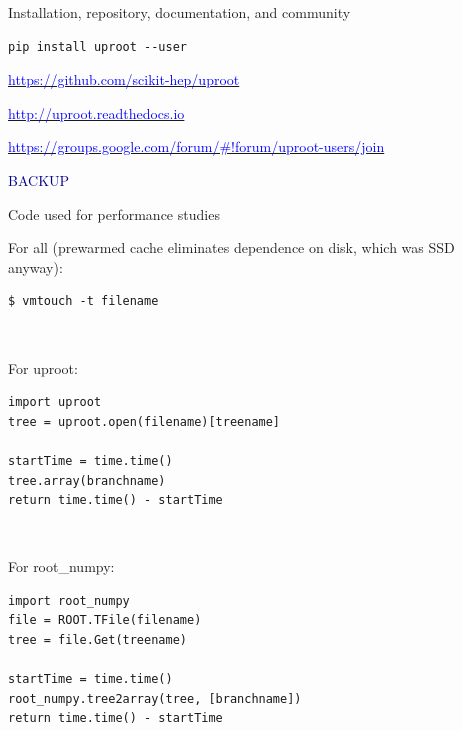 \documentclass[aspectratio=169]{beamer}
\begin{document}
\begin{frame}[fragile]{Installation, repository, documentation, and community}
\vspace{0.5 cm}
\huge
\begin{center}
\begin{minipage}{0.8\linewidth}
\begin{verbatim}
pip install uproot --user
\end{verbatim}
\end{minipage}

\Large
\vspace{1 cm}
\href{https://github.com/scikit-hep/uproot}{\textcolor{blue}{https://github.com/scikit-hep/uproot}}

\vspace{0.5 cm}
\href{http://uproot.readthedocs.io}{\textcolor{blue}{http://uproot.readthedocs.io}}

\vspace{0.5 cm}
\href{https://groups.google.com/forum/#!forum/uproot-users/join}{\textcolor{blue}{https://groups.google.com/forum/\#!forum/uproot-users/join}}
\end{center}
\end{frame}

\begin{frame}{}
\begin{center}
\Huge \textcolor{darkblue}{BACKUP}
\end{center}
\end{frame}

\begin{frame}[fragile]{Code used for performance studies}
\vspace{0.5 cm}
\scriptsize

{\normalsize For all (prewarmed cache eliminates dependence on disk, which was SSD anyway):}

\begin{verbatim}
$ vmtouch -t filename
\end{verbatim}

\vspace{0.5 cm}
\mbox{ } \hfill \begin{minipage}{0.5\linewidth}
{\normalsize For uproot:}

\begin{verbatim}
import uproot
tree = uproot.open(filename)[treename]

startTime = time.time()
tree.array(branchname)
return time.time() - startTime
\end{verbatim}
\end{minipage} \hfill \mbox{ }

\vspace{0.5 cm}
\hfill \begin{minipage}{0.5\linewidth}
{\normalsize For root\_numpy:}

\begin{verbatim}
import root_numpy
file = ROOT.TFile(filename)
tree = file.Get(treename)

startTime = time.time()
root_numpy.tree2array(tree, [branchname])
return time.time() - startTime
\end{verbatim}
\end{minipage}
\end{frame}
\end{document}
